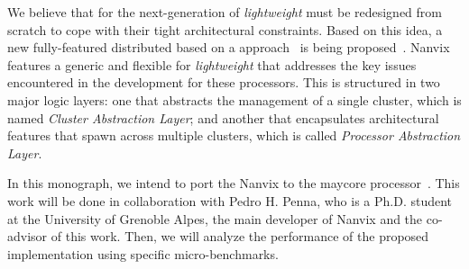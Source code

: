
    We believe that \oses for the next-generation of \textit{lightweight} \manycores must be redesigned from scratch to cope with their tight architectural constraints. Based on this idea, a new fully-featured distributed \os based on a \multikernel approach~\cite{Baumann2009} is being proposed~\cite{penna2017-1,penna2017-2,penna2019}. Nanvix features a generic and flexible \hal for \textit{lightweight} \manycores that addresses the key issues encountered in the development for these processors. This \hal is structured in two major logic layers: one that abstracts the management of a single cluster, which is named \textit{Cluster Abstraction Layer}; and another that encapsulates architectural features that spawn across multiple clusters, which is called \textit{Processor Abstraction Layer}.

    In this monograph, we intend to port the Nanvix \hal to the \mppa maycore processor~\cite{DeDinechin2013-1}. This work will be done in collaboration with Pedro H. Penna, who is a Ph.D. student at the University of Grenoble Alpes, the main developer of Nanvix and the co-advisor of this work. Then, we will analyze the performance of the proposed implementation using specific micro-benchmarks.

